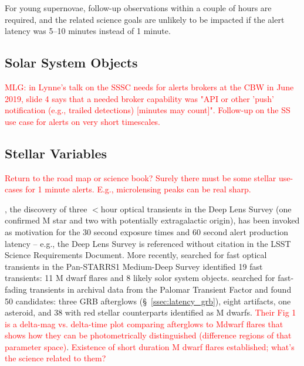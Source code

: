 \documentclass[DM,lsstdraft,authoryear,toc]{lsstdoc}
\begin{document}
For young supernovae, follow-up observations within a couple of hours are required, and the related science goals are unlikely to be impacted if the alert latency was 5--10 minutes instead of 1 minute.

\subsection{Solar System Objects}\label{ssec:latency_sso}

\textcolor{red}{MLG: in Lynne's talk on the SSSC needs for alerts brokers at the CBW in June 2019, slide 4 says that a needed broker capability was "API or other 'push' notification (e.g., trailed detections) [minutes may count]". Follow-up on the SS use case for alerts on very short timescales.}

\subsection{Stellar Variables}\label{ssec:latency_stars}

\textcolor{red}{Return to the road map or science book? Surely there must be some stellar use-cases for 1 minute alerts. E.g., microlensing peaks can be real sharp.}

\citet{2006ApJ...644L..63K}, the discovery of three $<$hour optical transients in the Deep Lens Survey (one confirmed M star and two with potentially extragalactic origin), has been invoked as motivation for the 30 second exposure times and 60 second alert production latency -- e.g., the Deep Lens Survey is referenced without citation in the LSST Science Requirements Document. More recently, \citet{2013ApJ...779...18B} searched for fast optical transients in the Pan-STARRS1 Medium-Deep Survey identified 19 fast transients: 11 M dwarf flares and 8 likely solor system objects. \citet{2018ApJ...854L..13H} searched for fast-fading transients in archival data from the Palomar Transient Factor and found 50 candidates: three GRB afterglows (\S~\ref{ssec:latency_grb}), eight artifacts, one asteroid, and 38 with red stellar counterparts identified as M dwarfs. \textcolor{red}{Their Fig 1 is a delta-mag vs. delta-time plot comparing afterglows to Mdwarf flares that shows how they can be photometrically distinguished (difference regions of that parameter space)}. \textcolor{red}{Existence of short duration M dwarf flares established; what's the science related to them?}



\clearpage
\end{document}
